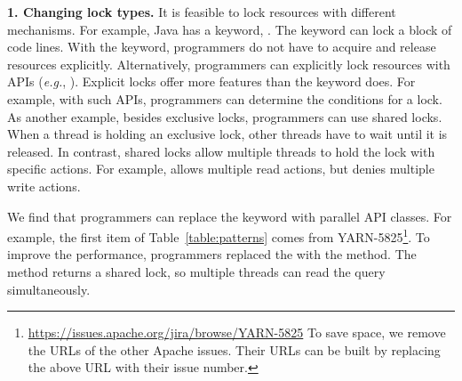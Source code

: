 \noindent
\textbf{1. Changing lock types.} It is feasible to lock resources with different mechanisms. For example, Java has a keyword, . The keyword can lock a block of code lines. With the keyword, programmers do not have to acquire and release resources explicitly. Alternatively, programmers can explicitly lock resources with APIs (\emph{e.g.}, ). Explicit locks offer more features than the  keyword does. For example, with such APIs, programmers can determine the conditions for a lock. As another example, besides exclusive locks, programmers can use shared locks. When a thread is holding an exclusive lock, other threads have to wait until it is released. In contrast, shared locks allow multiple threads to hold the lock with specific actions. For example,  allows multiple read actions, but denies multiple write actions.%


We find that programmers can replace the  keyword with parallel API classes. For example, the first item of Table~\ref{table:patterns} comes from YARN-5825\footnote{\url{https://issues.apache.org/jira/browse/YARN-5825} To save space, we remove the URLs of the other Apache issues. Their URLs can be built by replacing the above URL with their issue number.}. To improve the performance, programmers replaced the  with the  method. The method returns a shared lock, so multiple threads can read the query simultaneously.

